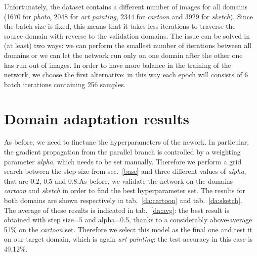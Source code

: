 \documentclass[11pt,twoside,a4paper]{article}
\begin{document}
Unfortunately, the dataset contains a different number of images for all domains (1670 for \emph{photo}, 2048 for \emph{art painting}, 2344 for \emph{cartoon} and 3929 for \emph{sketch}). Since the batch size is fixed, this means that it takes less iterations to traverse the source domain with reverse to the validation domains. The issue can be solved in (at least) two ways: we can perform the smallest number of iterations between all domains or we can let the network run only on one domain after the other one has run out of images. In order to have more balance in the training of the network, we choose the first alternative: in this way each epoch will consists of 6 batch iterations containing 256 samples. 

\section{Domain adaptation results}
As before, we need to finetune the hyperparameters of the nework. In particular, the gradient propagation from the parallel branch is controlled by a weighting parameter \emph{alpha}, which needs to be set manually. Therefore we perform a grid search between the step size from sec.~\ref{base} and three different values of \emph{alpha}, that are 0.2, 0.5 and 0.8.\newline As before, we validate the network on the domains \emph{cartoon} and \emph{sketch} in order to find the best hyperparameter set. The results for both domains are shown respectively in tab.~\ref{da:cartoon} and tab.~\ref{da:sketch}. The average of these results is indicated in tab.~\ref{da:avg}: the best result is obtained with step size=5 and alpha=0.5, thanks to a considerably above-average 51\% on the \emph{cartoon} set. Therefore we select this model as the final one and test it on our target domain, which is again \emph{art painting}: the test accuracy in this case is 49.12\%.
\end{document}
